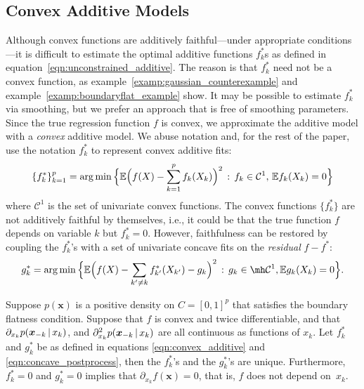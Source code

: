\subsection{Convex Additive Models}

Although convex functions are additively faithful---under appropriate conditions---it is difficult to
estimate the optimal additive functions $f^*_k$s as defined in
equation~\eqref{eqn:unconstrained_additive}.  The reason is that $f^*_k$ need not be
a convex function, as example~\ref{examp:gaussian_counterexample} and example~\ref{examp:boundaryflat_example} 
show. It may be possible to estimate $f^*_k$ via smoothing, but we prefer an approach that is free of smoothing parameters. 
Since the true regression function $f$ is convex, we approximate the additive model with a \emph{convex} additive model. We abuse notation and, for the rest of the paper, use the notation $f^*_k$ to represent convex additive fits:
\begin{equation}
\label{eqn:convex_additive}
\{ f^*_k \}_{k=1}^p = \arg\min \Big \{ 
    {\mathbb E}\Bigl( f(X) - \sum_{k=1}^p f_k(X_k) \Bigr)^2 \,:\, f_k \in \mathcal{C}^1, \, {\mathbb E} f_k(X_k) = 0 \Big \}
\end{equation}
where $\mathcal{C}^1$ is the set of univariate convex functions. 
The convex functions $\{f^*_k\}$ are not additively faithful by
themselves, i.e., it could be that the true function $f$ depends on variable $k$ but $f^*_k = 0$. However, faithfulness can be restored by coupling the $f^*_k$'s with a set of univariate concave fits on the \emph{residual} $f - f^*$:
\begin{equation}
\label{eqn:concave_postprocess}
g^*_k = \arg\min \Big\{
   \E\Bigl( f(X) - \sum_{k' \neq k} f^*_{k'}(X_{k'}) - g_k \Bigr)^2
    \,:\, g_k \in \mh \mathcal{C}^1, \E g_k(X_k) = 0 
  \Big\}.
\end{equation}


\begin{theorem}
\label{thm:acdc_faithful}
Suppose $p(\mathbf{x})$ is a positive density on $C=[0,1]^p$ that
satisfies the boundary flatness condition. Suppose that $f$ is convex
and twice differentiable, and that $\partial_{x_k} p( \mbox{\boldmath $x$}_{-k} {\,|\,} x_k )$, and
$\partial_{x_k}^2 p( \mbox{\boldmath $x$}_{-k} {\,|\,} x_k)$ are all continuous
as functions of $x_k$.  Let $f^*_k$ and $g^*_k$ be as defined in equations
\eqref{eqn:convex_additive} and \eqref{eqn:concave_postprocess}, then the $f^*_k$'s and the $g^*_k$'s are unique. Furthermore, 
$f^*_k = 0$ and $g^*_k = 0$ implies that $\partial_{x_k} f(\mathbf{x})
= 0$, that is, $f$ does not depend on~$x_k$. 
\end{theorem}

